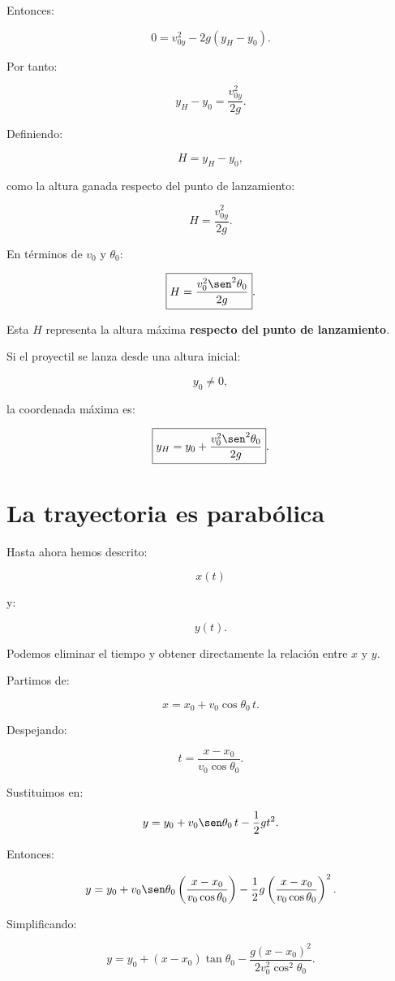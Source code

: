 Entonces:

\[
0
=
v_{0y}^2
-
2g(y_H-y_0).
\]

Por tanto:

\[
y_H-y_0
=
\frac{v_{0y}^2}{2g}.
\]

Definiendo:

\[
H=y_H-y_0,
\]

como la altura ganada respecto del punto de lanzamiento:

\[
\boxed{
H
=
\frac{v_{0y}^2}{2g}
}.
\]

En términos de \(v_0\) y \(\theta_0\):

\[
\boxed{
H
=
\frac{
v_0^2\sen^2\theta_0
}{
2g
}
}.
\]

\begin{advertencia}
Esta \(H\) representa la altura máxima \textbf{respecto del punto de lanzamiento}.

Si el proyectil se lanza desde una altura inicial:

\[
y_0\neq0,
\]

la coordenada máxima es:

\[
\boxed{
y_H
=
y_0
+
\frac{
v_0^2\sen^2\theta_0
}{
2g
}
}.
\]
\end{advertencia}


\section{La trayectoria es parabólica}

Hasta ahora hemos descrito:

\[
x(t)
\]

y:

\[
y(t).
\]

Podemos eliminar el tiempo y obtener directamente la relación entre \(x\) y
\(y\).

Partimos de:

\[
x
=
x_0
+
v_0\cos\theta_0\,t.
\]

Despejando:

\[
t
=
\frac{x-x_0}
{v_0\cos\theta_0}.
\]

Sustituimos en:

\[
y
=
y_0
+
v_0\sen\theta_0\,t
-
\frac{1}{2}gt^2.
\]

Entonces:

\[
y
=
y_0
+
v_0\sen\theta_0
\left(
\frac{x-x_0}
{v_0\cos\theta_0}
\right)
-
\frac{1}{2}g
\left(
\frac{x-x_0}
{v_0\cos\theta_0}
\right)^2.
\]

Simplificando:

\[
\boxed{
y
=
y_0
+
(x-x_0)\tan\theta_0
-
\frac{
g(x-x_0)^2
}{
2v_0^2\cos^2\theta_0
}
}.
\]

